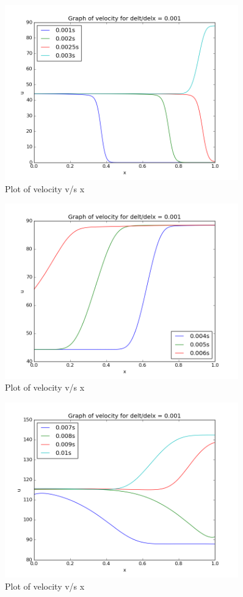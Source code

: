 \documentclass[11pt, a4paper]{article}
\begin{document}
\begin{figure}[H]
 \centering
 \includegraphics[width = 0.9\textwidth]{lax_fed_3_4.png}
 \caption{Plot of velocity v/s x}
\end{figure}
\begin{figure}[H]
 \centering
 \includegraphics[width = 0.9\textwidth]{lax_fed_3_5.png}
 \caption{Plot of velocity v/s x}
\end{figure}
\begin{figure}[H]
 \centering
 \includegraphics[width = 0.9\textwidth]{lax_fed_3_6.png}
 \caption{Plot of velocity v/s x}
\end{figure}
\end{document}
